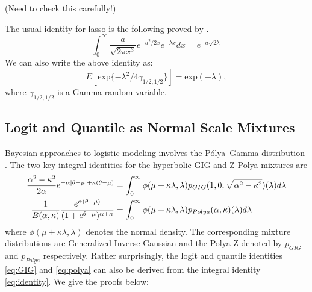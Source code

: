 \documentclass[lineno]{biometrika}
\def\PG{P{\'o}lya--Gamma }
\begin{document}
\begin{remark}
(Need to check this carefully!) 

The usual identity for lasso is the following proved by \citet{levy1940certains}.
$$
\int_{0}^{\infty} \frac{a}{\sqrt{2\pi x^3}} e^{-a^2/2x} e^{-\lambda x} dx = e^{-a\sqrt{2\lambda}} 
$$
We can also write the above identity as: 
$$
E \left[\mathrm{exp}\{-\lambda^2/4\gamma_{1/2,1/2} \} \right] = \mathrm{exp}(-\lambda), 
$$ where $\gamma_{1/2,1/2}$ is a Gamma random variable. 
\end{remark} 

\subsection{Logit and Quantile as Normal Scale Mixtures}
Bayesian approaches to logistic modeling involves the \PG distribution \citep{polson2013bayesian}. The two key integral identities for the hyperbolic-GIG \citep{barndorff1977infinite} and Z-Polya mixtures \citep{polson2013bayesian,barndorff1982normal} are 
\begin{align}
\frac{\alpha^2-\kappa^2}{2\alpha} {\rm e}^{-\alpha|\theta-\mu| + \kappa(\theta-\mu)} & = \int_0^{\infty} \phi(\mu + \kappa \lambda, \lambda) p_{GIG}(1,0,\sqrt{\alpha^2-\kappa^2}) (\lambda) d\lambda \label{eq:GIG}\\
\frac{1}{B(\alpha,\kappa)} \frac{e^{\alpha(\theta-\mu)}}{(1+e^{\theta-\mu})^{\alpha + \kappa}} & = \int_0^{\infty} \phi(\mu + \kappa \lambda, \lambda) p_{Polya}(\alpha,\kappa) (\lambda) d\lambda \label{eq:polya}
\end{align}
where $\phi(\mu + \kappa \lambda, \lambda)$ denotes the normal density. The corresponding mixture distributions are Generalized Inverse-Gaussian and the Polya-Z denoted by $p_{GIG}$ and $p_{Polya}$ respectively. Rather surprisingly, the logit and quantile identities \eqref{eq:GIG} and \eqref{eq:polya} can also be derived from the integral identity \eqref{eq:identity}. We give the proofs below: 
\end{document}
